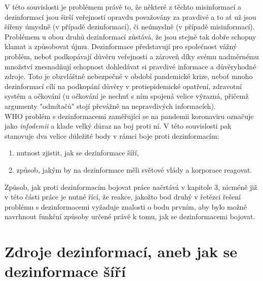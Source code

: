 V této souvislosti je problémem právě to, že některé z těchto misinformací a dezinformací jsou širší veřejností opravdu považovány za pravdivé a to ať už jsou šířeny úmyslně (v případě dezinformací), či neúmyslně (v případě misinformací). Problémem u obou druhů dezinformací zůstává, že jsou stejně tak dobře schopny klamat a způsobovat újmu. Dezinformace představují pro společnost vážný problém, neboť podkopávají důvěru veřejnosti a zároveň díky svému nadměrnému množství znesnadňují schopnost dohledávat si pravdivé informace a důvěryhodné zdroje. Toto je obzvláštně nebezpečné v období pandemické krize, neboť mnoho dezinformací cílí na podkopání důvěry v protiepidemické opatření, zdravotní systém a očkování (u očkování je nechuť s ním spojená velice výrazná, přičemž argumenty "odmítačů" stojí převážně na nepravdivých informacích).\\ %

WHO problém s dezinformacemi zaměřující se na pandemii koronaviru označuje jako \textit{infodemii} a klade velký důraz na boj proti ní\cite{noauthor_covid-19_nodate}. V této souvislosti pak stanovuje dva velice důležité body v rámci boje proti dezinformacím:

\begin{enumerate}
\item nutnost zjistit, jak se dezinformace šíří,
\item způsob, jakým by na dezinformace měli světové vlády a korporace reagovat.	
\end{enumerate}


Způsob, jak proti dezinformacím bojovat práce načrtává v kapitole 3, nicméně již v této části práce je nutné řící, že reakce, jakožto bod druhý v řetězci řešení problému s dezinformacemi vyžaduje znalosti o bodu prvním, aby bylo možné navrhnout funkční způsoby určené právě k tomu, jak se dezinformacemi bojovat.


\section{Zdroje dezinformací, aneb jak se dezinformace šíří}

